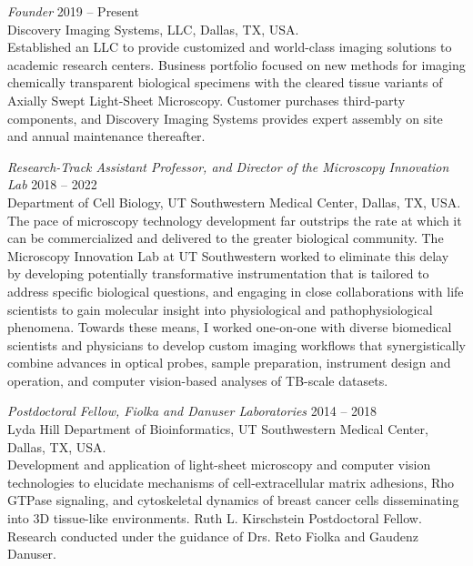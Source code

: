 {\sl Founder} \hfill 2019 -- Present \\ 
Discovery Imaging Systems, LLC, Dallas, TX, USA. \hfill \\
\forceindent Established an LLC to provide customized and world-class imaging solutions to academic research centers.  Business portfolio focused on new methods for imaging chemically transparent biological specimens with the cleared tissue variants of Axially Swept Light-Sheet Microscopy.  Customer purchases third-party components, and Discovery Imaging Systems provides expert assembly on site and annual maintenance thereafter.

{\sl Research-Track Assistant Professor, and Director of the Microscopy Innovation Lab} \hfill 2018 -- 2022 \\ 
Department of Cell Biology, UT Southwestern Medical Center, Dallas, TX, USA. \hfill \\
\forceindent The pace of microscopy technology development far outstrips the rate at which it can be commercialized and delivered to the greater biological community.  The Microscopy Innovation Lab at UT Southwestern worked to eliminate this delay by developing potentially transformative instrumentation that is tailored to address specific biological questions, and engaging in close collaborations with life scientists to gain molecular insight into physiological and pathophysiological phenomena. Towards these means, I worked one-on-one with diverse biomedical scientists and physicians to develop custom imaging workflows that synergistically combine advances in optical probes, sample preparation, instrument design and operation, and computer vision-based analyses of TB-scale datasets. 

{\sl Postdoctoral Fellow, Fiolka and Danuser Laboratories} \hfill 2014 -- 2018 \\ 
Lyda Hill Department of Bioinformatics, UT Southwestern Medical Center, Dallas, TX, USA. \hfill \\
\forceindent Development and application of light-sheet microscopy and computer vision technologies to elucidate mechanisms of cell-extracellular matrix adhesions, Rho GTPase signaling, and cytoskeletal dynamics of breast cancer cells disseminating into 3D tissue-like environments. Ruth L. Kirschstein Postdoctoral Fellow.  Research conducted under the guidance of Drs. Reto Fiolka and Gaudenz Danuser.

